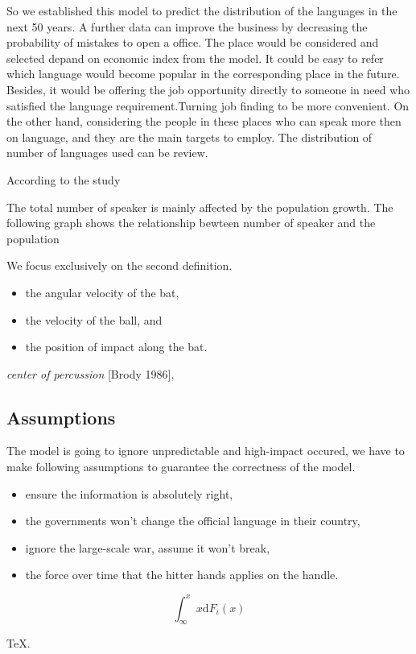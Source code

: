 \documentclass{mcmthesis}
\begin{document}
So we established this model to predict the distribution of the languages in the next 50 years. A further data can improve the business by decreasing
the probability of mistakes to open a office. The place would be considered and selected depand on economic index from the model.
It could be easy to refer which language would become popular in the corresponding place in the future. Besides,
it would be offering the job opportunity directly to someone in need who satisfied the language requirement.Turning job finding to be more convenient.
On the other hand, considering the people in these places who can speak more then on language, and they are the 
main targets to employ. The distribution of number of languages used can be review.
 
 
According to the study 

The total number of speaker is mainly affected by the population growth. The following graph shows the relationship bewteen number of speaker and the population


We focus exclusively on the second definition.


\begin{itemize}
\item the angular velocity of the bat,
\item the velocity of the ball, and
\item the position of impact along the bat.
\end{itemize}

\emph{center of percussion} [Brody 1986],

\subsection{Assumptions}
\qquad The model is going to ignore unpredictable and high-impact occured, we have to make following assumptions to guarantee the correctness of the model.
\begin{itemize}
\item ensure the information is absolutely right, 
\item the governments won't change the official language in their country,
\item ignore the large-scale war, assume it won't break,
\item the force over time that the hitter hands applies on the handle.
\end{itemize}


\begin{Theorem} \label{thm:latex}
\begin{equation}\int^x_\infty x \mathrm{d}F_\iota(x)
\end{equation}
\end{Theorem}
\begin{Lemma} \label{thm:tex}
\TeX .
\end{Lemma}
\end{document}

